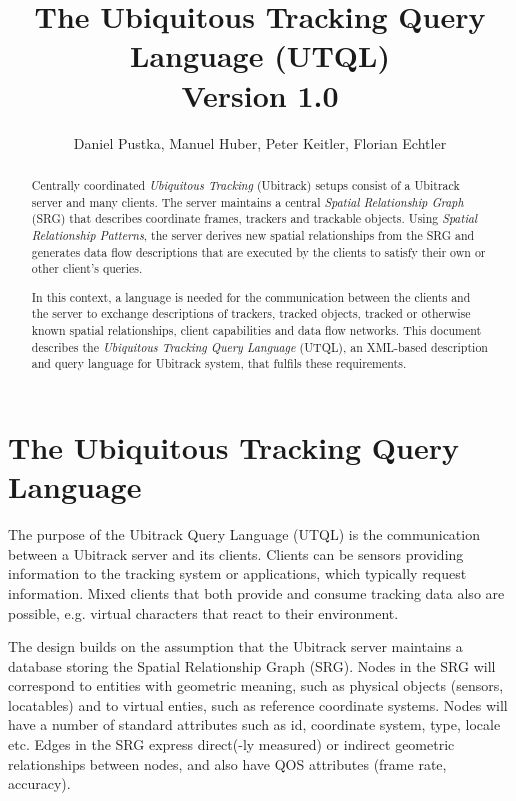 \documentclass[11pt]{article}
\title{The Ubiquitous Tracking Query Language (UTQL)\\Version 1.0}
\author{Daniel Pustka, Manuel Huber, Peter Keitler, Florian Echtler}
\begin{document}
\maketitle

\begin{abstract}
Centrally coordinated \emph{Ubiquitous Tracking} (Ubitrack) setups consist of a Ubitrack server and many clients. The server maintains a central \emph{Spatial Relationship Graph} (SRG) that describes coordinate frames, trackers and trackable objects. Using \emph{Spatial Relationship Patterns}, the server derives new spatial relationships from the SRG and generates data flow descriptions that are executed by the clients to satisfy their own or other client's queries.

In this context, a language is needed for the communication between the clients and the server to exchange descriptions of trackers, tracked objects, tracked or otherwise known spatial relationships, client capabilities and data flow networks. This document describes the \emph{Ubiquitous Tracking Query Language} (UTQL), an XML-based description and query language for Ubitrack system, that fulfils these requirements.
\end{abstract}

\newpage
\tableofcontents
\newpage

\section{The Ubiquitous Tracking Query Language}
\label{utql}

The purpose of the Ubitrack Query Language
(UTQL) is the communication between a Ubitrack server and its clients. Clients
can be sensors providing information to the tracking system or applications,
which typically request information. Mixed clients that both provide and
consume tracking data also are possible, e.g. virtual characters that react to
their environment.

The design builds on the assumption that
the Ubitrack server maintains a database storing the Spatial Relationship Graph
(SRG). Nodes in the SRG will correspond to entities with geometric meaning,
such as physical objects (sensors, locatables) and to virtual enties, such as
reference coordinate systems. Nodes will have a number of standard attributes
such as id, coordinate system, type, locale etc. Edges in the SRG express
direct(-ly measured) or indirect geometric relationships between nodes, and
also have QOS attributes (frame rate, accuracy).
\end{document}
